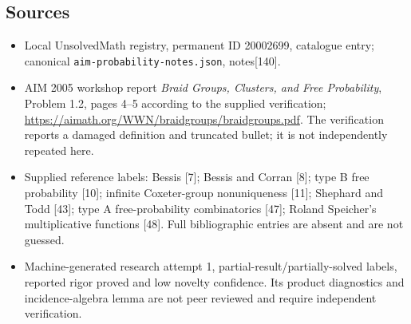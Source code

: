 \documentclass[11pt]{article}
\begin{document}
\subsection{Sources}
\begin{itemize}
\item Local UnsolvedMath registry, permanent ID 20002699, catalogue entry; canonical \texttt{aim-probability-notes.json}, notes[140].
\item AIM 2005 workshop report \emph{Braid Groups, Clusters, and Free Probability}, Problem 1.2, pages 4--5 according to the supplied verification; \url{https://aimath.org/WWN/braidgroups/braidgroups.pdf}. The verification reports a damaged definition and truncated bullet; it is not independently repeated here.
\item Supplied reference labels: Bessis [7]; Bessis and Corran [8]; type B free probability [10]; infinite Coxeter-group nonuniqueness [11]; Shephard and Todd [43]; type A free-probability combinatorics [47]; Roland Speicher's multiplicative functions [48]. Full bibliographic entries are absent and are not guessed.
\item Machine-generated research attempt 1, partial-result/partially-solved labels, reported rigor proved and low novelty confidence. Its product diagnostics and incidence-algebra lemma are not peer reviewed and require independent verification.
\end{itemize}
\end{document}
